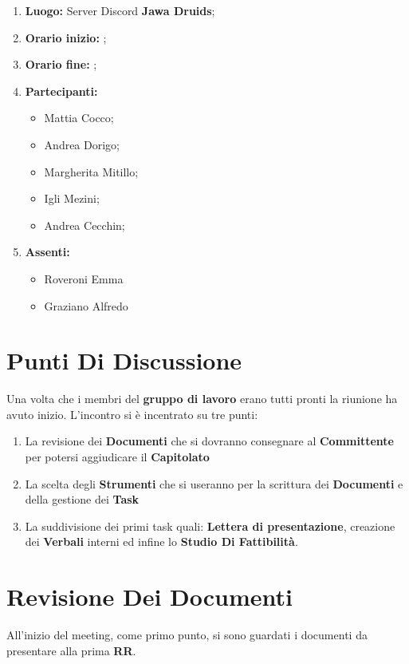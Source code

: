 \documentclass[a4paper,12pt]{report}
\begin{document}
	\makeatother	
	\newpage
	\begin{enumerate}
		\item \textbf{Luogo:} \normalfont Server Discord \textbf{Jawa Druids};
		\item \textbf{Orario inizio:} ;
		\item \textbf{Orario fine:} ;
		\item \textbf{Partecipanti:}
		\begin{itemize}
			\item Mattia Cocco; 
			\item Andrea Dorigo;
			\item Margherita Mitillo;
			\item Igli Mezini;
			\item Andrea Cecchin;
		\end{itemize}
		\item \textbf{Assenti:}
		\begin{itemize}
			\item Roveroni Emma
			\item Graziano Alfredo
		\end{itemize}
	\end{enumerate}
	\newpage
	\tableofcontents{}
	\chapter{Punti Di Discussione}
	Una volta che i membri del \textbf{gruppo di lavoro} erano tutti pronti la riunione ha avuto inizio.
	L'incontro si è incentrato su tre punti:
	\begin{enumerate}
		\item La revisione dei \textbf{Documenti} che si dovranno consegnare al \textbf{Committente} per potersi aggiudicare il \textbf{Capitolato}
		
		\item La scelta degli \textbf{Strumenti} che si useranno per la scrittura dei \textbf{Documenti} e della gestione dei \textbf{Task}
		
		\item La suddivisione dei primi task quali: \textbf{Lettera di presentazione}, creazione dei \textbf{Verbali} interni ed infine lo \textbf{Studio Di Fattibilità}.
	\end{enumerate}
	\chapter{Revisione Dei Documenti}
	All'inizio del meeting, come primo punto, si sono guardati i documenti da presentare alla prima \textbf{RR}.
	
\end{document}
